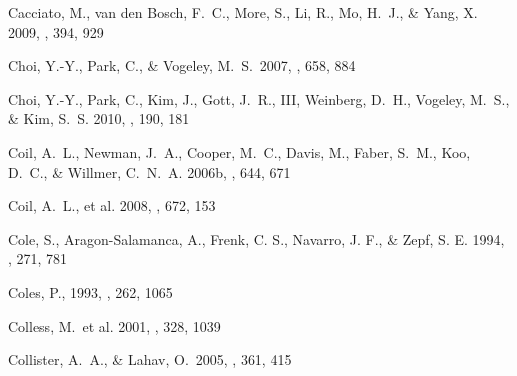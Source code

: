 \documentclass[]{emulateapj}
\begin{document}
\begin{thebibliography}{999}
Cacciato, M., van den Bosch, F.\ C., More, S., Li, R., Mo, H.\ J., \&
Yang, X. 2009, \mnras, 394, 929

Choi, Y.-Y., Park, C., \& Vogeley, M.~S.\ 2007, \apj, 658, 884 

Choi, Y.-Y., Park, C., Kim, J., Gott, J.~R., III, Weinberg, D.~H., Vogeley, 
M.~S., \& Kim, S.~S. 2010, \apjs, 190, 181 %



Coil, A.\ L., Newman, J.\ A., Cooper, M.\ C., Davis, M., Faber, S.\ M., Koo,
D.\ C., \& Willmer, C.\ N.\ A. 2006b,
\apj, 644, 671

Coil, A.\ L., et al. 2008,
\apj, 672, 153 %

Cole, S., Aragon-Salamanca, A., Frenk, C. S., Navarro, J. F., \& Zepf, S. E.
1994, \mnras, 271, 781

Coles, P., 1993, \mnras, 262, 1065

Colless, M.~et al. 2001, \mnras, 328, 1039 

Collister, A.~A., \& Lahav, O.\ 2005, \mnras, 361, 415 



\end{thebibliography}
\end{document}
